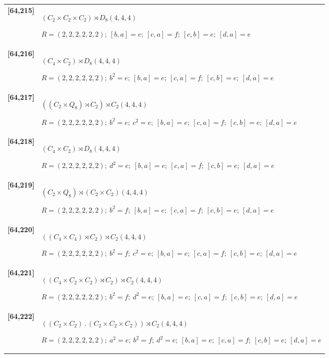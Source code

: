 \documentclass[UTF8,fontset=fandol,11pt,a4paper]{ctexart}
\begin{document}
\begin{longtable}{@{}p{17mm}>{\raggedright\arraybackslash}p{141mm}@{}}
\textbf{[64,215]} & $(C_{2}\times C_{2}\times C_{2})\rtimes D_{8}$\quad $(4,4,4)$\par\(R=(2,2,2,2,2,2);\allowbreak\ [b,a]=e;\allowbreak\ [c,a]=f;\allowbreak\ [c,b]=e;\allowbreak\ [d,a]=e\)\\[3pt]

\textbf{[64,216]} & $(C_{4}\times C_{2})\rtimes D_{8}$\quad $(4,4,4)$\par\(R=(2,2,2,2,2,2);\allowbreak\ b^{2}=e;\allowbreak\ [b,a]=e;\allowbreak\ [c,a]=f;\allowbreak\ [c,b]=e;\allowbreak\ [d,a]=e\)\\[3pt]

\textbf{[64,217]} & $((C_{2}\times Q_{8})\rtimes C_{2})\rtimes C_{2}$\quad $(4,4,4)$\par\(R=(2,2,2,2,2,2);\allowbreak\ b^{2}=e;\allowbreak\ c^{2}=e;\allowbreak\ [b,a]=e;\allowbreak\ [c,a]=f;\allowbreak\ [c,b]=e;\allowbreak\ [d,a]=e\)\\[3pt]

\textbf{[64,218]} & $(C_{4}\times C_{2})\rtimes D_{8}$\quad $(4,4,4)$\par\(R=(2,2,2,2,2,2);\allowbreak\ d^{2}=e;\allowbreak\ [b,a]=e;\allowbreak\ [c,a]=f;\allowbreak\ [c,b]=e;\allowbreak\ [d,a]=e\)\\[3pt]

\textbf{[64,219]} & $(C_{2}\times Q_{8})\rtimes (C_{2}\times C_{2})$\quad $(4,4,4)$\par\(R=(2,2,2,2,2,2);\allowbreak\ b^{2}=f;\allowbreak\ [b,a]=e;\allowbreak\ [c,a]=f;\allowbreak\ [c,b]=e;\allowbreak\ [d,a]=e\)\\[3pt]

\textbf{[64,220]} & $((C_{4}\times C_{4})\rtimes C_{2})\rtimes C_{2}$\quad $(4,4,4)$\par\(R=(2,2,2,2,2,2);\allowbreak\ b^{2}=f;\allowbreak\ c^{2}=e;\allowbreak\ [b,a]=e;\allowbreak\ [c,a]=f;\allowbreak\ [c,b]=e;\allowbreak\ [d,a]=e\)\\[3pt]

\textbf{[64,221]} & $((C_{4}\times C_{2}\times C_{2})\rtimes C_{2})\rtimes C_{2}$\quad $(4,4,4)$\par\(R=(2,2,2,2,2,2);\allowbreak\ b^{2}=f;\allowbreak\ d^{2}=e;\allowbreak\ [b,a]=e;\allowbreak\ [c,a]=f;\allowbreak\ [c,b]=e;\allowbreak\ [d,a]=e\)\\[3pt]

\textbf{[64,222]} & $((C_{2}\times C_{2})\mathbin{.} (C_{2}\times C_{2}\times C_{2}))\rtimes C_{2}$\quad $(4,4,4)$\par\(R=(2,2,2,2,2,2);\allowbreak\ a^{2}=e;\allowbreak\ b^{2}=f;\allowbreak\ d^{2}=e;\allowbreak\ [b,a]=e;\allowbreak\ [c,a]=f;\allowbreak\ [c,b]=e;\allowbreak\ [d,a]=e\)\\[3pt]


\end{longtable}
\end{document}
